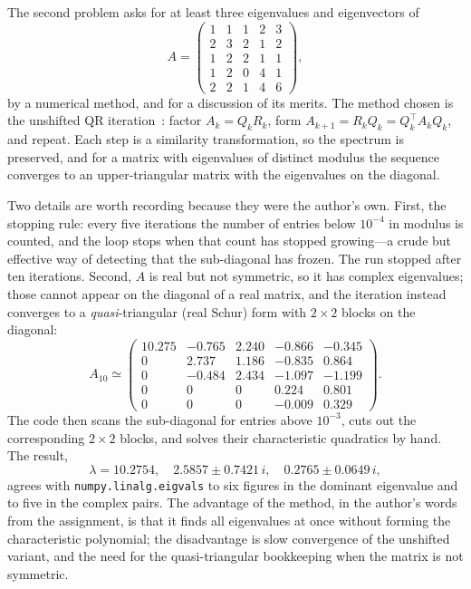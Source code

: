 \documentclass[aps,pra,twocolumn,superscriptaddress,floatfix,nofootinbib]{revtex4-2}
\begin{document}
The second problem asks for at least three eigenvalues and eigenvectors of
\begin{equation}
A=\begin{pmatrix}
1&1&1&2&3\\ 2&3&2&1&2\\ 1&2&2&1&1\\ 1&2&0&4&1\\ 2&2&1&4&6
\end{pmatrix},
\label{eq:A}
\end{equation}
by a numerical method, and for a discussion of its merits. The method chosen is the unshifted QR iteration~\cite{Francis1961,Francis1962,GolubVanLoan2013}: factor $A_k=Q_kR_k$, form $A_{k+1}=R_kQ_k=Q_k^{\!\top}A_kQ_k$, and repeat. Each step is a similarity transformation, so the spectrum is preserved, and for a matrix with eigenvalues of distinct modulus the sequence converges to an upper-triangular matrix with the eigenvalues on the diagonal.

Two details are worth recording because they were the author's own. First, the stopping rule: every five iterations the number of entries below $10^{-4}$ in modulus is counted, and the loop stops when that count has stopped growing---a crude but effective way of detecting that the sub-diagonal has frozen. The run stopped after ten iterations. Second, $A$ is real but not symmetric, so it has complex eigenvalues; those cannot appear on the diagonal of a real matrix, and the iteration instead converges to a \emph{quasi}-triangular (real Schur) form with $2\times2$ blocks on the diagonal:
\begin{equation}
A_{10}\simeq\begin{pmatrix}
10.275&-0.765&2.240&-0.866&-0.345\\
0&2.737&1.186&-0.835&0.864\\
0&-0.484&2.434&-1.097&-1.199\\
0&0&0&0.224&0.801\\
0&0&0&-0.009&0.329
\end{pmatrix}.
\end{equation}
The code then scans the sub-diagonal for entries above $10^{-3}$, cuts out the corresponding $2\times2$ blocks, and solves their characteristic quadratics by hand. The result,
\begin{equation}
\lambda = 10.2754,\quad 2.5857\pm0.7421\,i,\quad 0.2765\pm0.0649\,i,
\end{equation}
agrees with \texttt{numpy.linalg.eigvals} to six figures in the dominant eigenvalue and to five in the complex pairs. The advantage of the method, in the author's words from the assignment, is that it finds all eigenvalues at once without forming the characteristic polynomial; the disadvantage is slow convergence of the unshifted variant, and the need for the quasi-triangular bookkeeping when the matrix is not symmetric.
\end{document}
